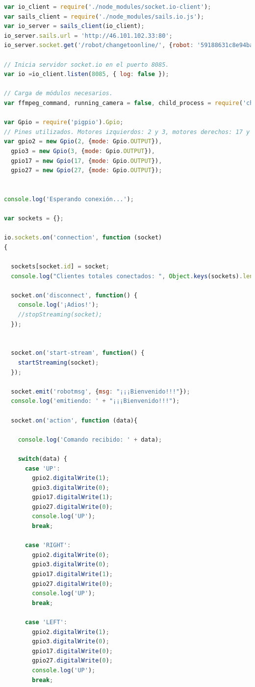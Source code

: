 \begin{lstlisting}[language=JavaScript]
var io_client = require('./node_modules/socket.io-client');
var sails_client = require('./node_modules/sails.io.js');
var io_server = sails_client(io_client);
io_server.sails.url = 'http://46.101.102.33:80';
io_server.socket.get('/robot/changetoonline/', {robot: '59188631c8e94ba54f7a4bdc', online: true});

// Inicia servidor socket.io en el puerto 8085.
var io =io_client.listen(8085, { log: false });

// Carga de módulos necesarios.
var ffmpeg_command, running_camera = false, child_process = require('child_process');

var Gpio = require('pigpio').Gpio;
// Pines utilizados. Motores izquierdos: 2 y 3, motores derechos: 17 y 27
var gpio2 = new Gpio(2, {mode: Gpio.OUTPUT}),
  gpio3 = new Gpio(3, {mode: Gpio.OUTPUT}),
  gpio17 = new Gpio(17, {mode: Gpio.OUTPUT}),
  gpio27 = new Gpio(27, {mode: Gpio.OUTPUT});


console.log('Esperando conexión...');

var sockets = {};

io.sockets.on('connection', function (socket)
{

  sockets[socket.id] = socket;
  console.log("Clientes totales conectados: ", Object.keys(sockets).length);

  socket.on('disconnect', function() {
    console.log('¡Adios!');
    //stopStreaming(socket);
  });


  socket.on('start-stream', function() {
    startStreaming(socket);
  });

  socket.emit('robotmsg', {msg: "¡¡¡Bienvenido!!!"});
  console.log('emitiendo: ' + "¡¡¡Bienvenido!!!");

  socket.on('action', function (data){

    console.log('Comando recibido: ' + data);

    switch(data) {
      case 'UP':
        gpio2.digitalWrite(1);
        gpio3.digitalWrite(0);
        gpio17.digitalWrite(1);
        gpio27.digitalWrite(0);
        console.log('UP');
        break;

      case 'RIGHT':
        gpio2.digitalWrite(0);
        gpio3.digitalWrite(0);
        gpio17.digitalWrite(1);
        gpio27.digitalWrite(0);
        console.log('UP');
        break;

      case 'LEFT':
        gpio2.digitalWrite(1);
        gpio3.digitalWrite(0);
        gpio17.digitalWrite(0);
        gpio27.digitalWrite(0);
        console.log('UP');
        break;


\end{lstlisting}
